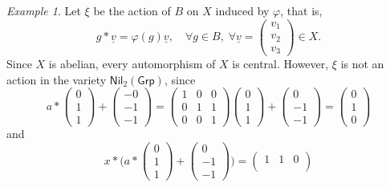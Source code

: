 \documentclass[reqno,hidelinks,a4paper]{amsart}
\theoremstyle{plain}
\theoremstyle{definition}
\theoremstyle{remark}
\newtheorem{example}[subsection]{Example}
\numberwithin{equation}{section}
\newcommand{\Grp}{\ensuremath{\mathsf{Grp}}}
\newcommand{\Nil}{\ensuremath{\mathsf{Nil}}}
\begin{document}
\begin{example}
    Let \(\xi\) be the action of \(B\) on \(X\) induced by \(\varphi\), that is,
    \[
        g \ast \underline{v}=\varphi(g) \underline{v}, \quad \forall g \in B, \; \forall \underline{v}=\begin{pmatrix}
            v_1 \\ v_2 \\ v_3
        \end{pmatrix} \in X.
    \]
    Since \(X\) is abelian, every automorphism of \(X\) is central. However, \(\xi\) is not an action in the variety \(\Nil_2(\Grp)\), since
    \[
        a \ast \begin{pmatrix}
            0 \\ 1 \\ 1
        \end{pmatrix} + \begin{pmatrix}
            -0 \\ -1 \\ -1
        \end{pmatrix} = \begin{pmatrix}
            1 & 0 & 0 \\
            0 & 1 & 1 \\
            0 & 0 & 1
        \end{pmatrix} \begin{pmatrix}
            0 \\ 1 \\ 1
        \end{pmatrix} + \begin{pmatrix}
            0 \\ -1 \\ -1
        \end{pmatrix} = \begin{pmatrix}
            0 \\ 1 \\ 0
        \end{pmatrix}
    \]
    and
    \[
        x* \Bigg( a \ast \begin{pmatrix}
                0 \\ 1 \\ 1
            \end{pmatrix} + \begin{pmatrix}
                0 \\ -1 \\ -1
            \end{pmatrix} \Bigg)=\begin{pmatrix}
            1 & 1 & 0 \\

\end{pmatrix}\]
\end{example}
\end{document}

